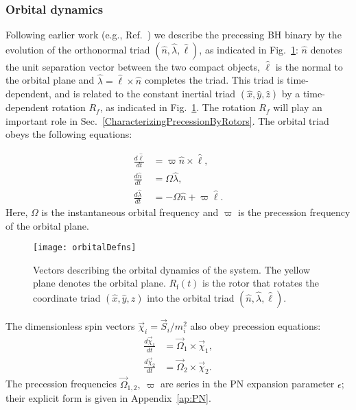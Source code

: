\documentclass[aps,prd,amsmath,floatfix,twocolumn,superscriptaddress,nofootinbib,showpacs]{revtex4-1}
\newcommand{\ellHat}{\ensuremath{\hat{\ell}}}
\newcommand{\nHat}{\ensuremath{\hat{n}}}
\newcommand{\lambdaHat}{\ensuremath{\hat{\lambda}}}
\newcommand{\Rf}[1][]{\ensuremath{R_{\text{f#1}}}}
\begin{document}


\subsubsection{Orbital dynamics}
\label{sec:OrbitalEvolution}

Following earlier work (e.g., Ref.~\cite{Kidder:1995zr}) we describe the
precessing BH binary by the evolution of the orthonormal triad
$(\hat{n},\hat{\lambda},\ellHat)$, as indicated in
Fig.~\ref{fig:orbitalDefns}: $\hat{n}$ denotes the unit separation
vector between the two compact objects, $\ellHat$ is the normal to the
orbital plane and $\lambdaHat=\ellHat\times \nHat$ completes the
triad. This triad is time-dependent, and
is related to the constant inertial triad
$(\hat{x},\hat{y},\hat{z})$ by a time-dependent rotation $R_{f}$, as
indicated in Fig.~\ref{fig:orbitalDefns}. The rotation $R_f$ will play
an important role in Sec.~\ref{CharacterizingPrecessionByRotors}.  The
orbital triad obeys the following
equations:


\begin{subequations}
  \label{eq:TriadEvolution}
  \begin{align}
    \frac{d\ellHat}{dt} &= \varpi\nHat\times\ellHat \label{eq:ellHatEv},\\
    \frac{d\hat{n}}{dt} &= \Omega\hat{\lambda},\label{eq:n-evolution}\\
    \frac{d\hat{\lambda}}{dt} &= -\Omega\hat{n} + \varpi\ellHat. \label{eq:lambEv}
  \end{align}
\end{subequations}
Here, $\Omega$ is the instantaneous orbital frequency and
$\varpi$ is the precession frequency of the orbital
plane. 


\begin{figure}
  \texttt{[image: orbitalDefns]}
  \caption{Vectors describing the orbital dynamics of the system. The
    yellow plane denotes the orbital plane.  $\Rf(t)$ is the rotor
    that rotates the coordinate triad $(\hat{x}, \hat{y}, \hat{z})$
    into the orbital triad $(\nHat,\lambdaHat,\ellHat)$.}
  \label{fig:orbitalDefns}
\end{figure}


The dimensionless spin vectors $\vec{\chi}_i = \vec{S}_i/m^2_i$ also
obey precession equations:
\begin{subequations}
  \label{eq:SpinsEv}
  \begin{align}
    \frac{d\vec{\chi}_{1}}{dt} &= \vec{\Omega}_{1}\times \vec{\chi}_{1},
    \\
    \frac{d\vec{\chi}_{2}}{dt} &= \vec{\Omega}_{2}\times \vec{\chi}_{2}.
  \end{align}
\end{subequations}
The precession frequencies $\vec{\Omega}_{1,2},\ \varpi$ are series in
the PN expansion parameter $\epsilon$; their explicit form is given in
Appendix~\ref{ap:PN}.
\end{document}
